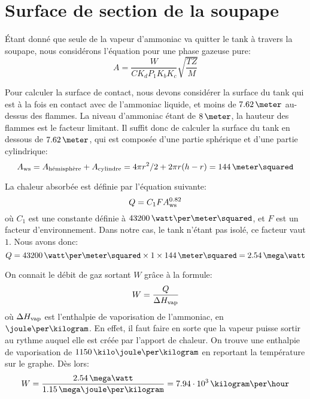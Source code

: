 \section{Surface de section de la soupape}
Étant donné que seule de la vapeur d'ammoniac
va quitter le tank à travers la soupape,
nous considérons l'équation pour une phase gazeuse pure:
\begin{equation}
    \label{eq:big-surface}
    A=\frac{W}{CK_dP_1K_bK_c} \sqrt{\frac{TZ}{M}}
\end{equation}

Pour calculer la surface de contact,
nous devons considérer la surface du tank qui est à la fois en contact
avec de l'ammoniac liquide, et moins de $7.62\,\meter$ au-dessus des flammes.
La niveau d'ammoniac étant de $8\,\meter$,
la hauteur des flammes est le facteur limitant.
Il suffit donc de calculer la surface du tank en dessous de $7.62\,\meter$,
qui est composée d'une partie sphérique et d'une partie cylindrique:
\begin{equation*}
    A\ind{ws} = A\ind{hémisphère} + A\ind{cylindre}
    = 4\pi r^2/2 + 2\pi r (h-r)
    = 144\,\meter\squared
\end{equation*}

La chaleur absorbée est définie par l'équation suivante:
\begin{equation}
    Q = C_1 F A_{\mbox{\scriptsize{ws}}}^{0.82}
\end{equation}
où $C_1$ est une constante définie à $43200\,\watt\per\meter\squared$, et $F$ est un facteur
d'environnement. Dans notre cas, le tank n'étant pas isolé,
ce facteur vaut $1$. Nous avons donc:
\begin{equation*}
    Q = 43200\,\watt\per\meter\squared \times 1 \times 144\,\meter\squared
    = 2.54\,\mega\watt
\end{equation*}

On connait le débit de gaz sortant $W$ grâce à la formule:
\begin{equation}
    W=\frac{Q}{\Delta H_{\mbox{\scriptsize{vap}}}}
\end{equation}
où $\Delta H_{\mbox{\scriptsize{vap}}}$ est l'enthalpie de vaporisation de l'ammoniac,
en $\joule\per\kilogram$.
En effet, il faut faire en sorte que la vapeur puisse sortir au rythme auquel
elle est créée par l'apport de chaleur.
On trouve une enthalpie de vaporisation de $1150\,\kilo\joule\per\kilogram$
en reportant la température sur le graphe.
Dès lors:
\begin{equation*}
    W = \frac{2.54\,\mega\watt}{1.15\,\mega\joule\per\kilogram}
    = 7.94\cdot10^3\,\kilogram\per\hour
\end{equation*}

